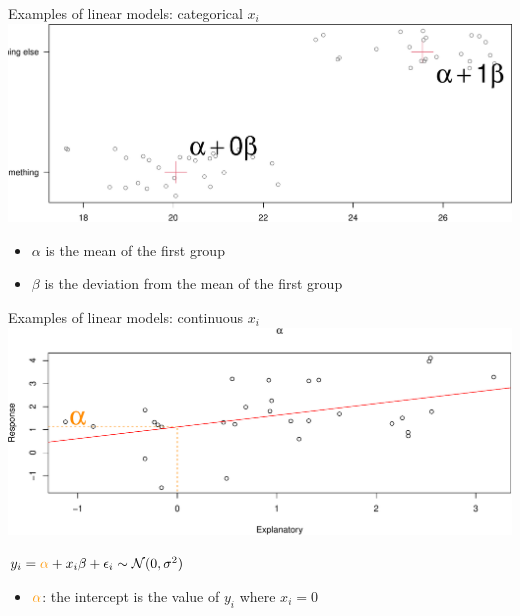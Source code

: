 \documentclass[
  ignorenonframetext,
]{beamer}
\providecommand{\tightlist}{%
  \setlength{\itemsep}{0pt}\setlength{\parskip}{0pt}}
\begin{document}
\begin{frame}{Examples of linear models: categorical \(x_i\)}
\protect\hypertarget{examples-of-linear-models-categorical-x_i-2}{}
\includegraphics{IntroLM_files/figure-beamer/unnamed-chunk-10-1.pdf}

\begin{itemize}
\tightlist
\item
  \(\alpha\) is the mean of the first group
\item
  \(\beta\) is the deviation from the mean of the first group
\end{itemize}
\end{frame}

\begin{frame}{Examples of linear models: continuous \(x_i\)}
\protect\hypertarget{examples-of-linear-models-continuous-x_i}{}
\includegraphics{IntroLM_files/figure-beamer/reg-1.pdf}

\(y_i = \textcolor{darkorange}{\alpha} + x_i\beta + \epsilon_i\sim \mathcal{N}(0,\sigma^2)\)

\begin{itemize}
\tightlist
\item
  \(\textcolor{darkorange}{\alpha}\): the intercept is the value of
  \(y_i\) where \(x_i = 0\)
\end{itemize}
\end{frame}
\end{document}
